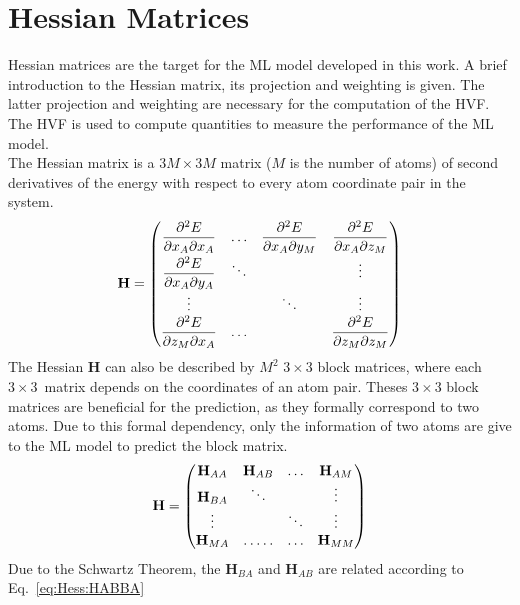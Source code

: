 \newpage
    \section{Hessian Matrices}
	Hessian matrices are the target for the ML model developed in this work.
	A brief introduction to the Hessian matrix, its projection and weighting is given.
	The latter projection and weighting are necessary for the computation of the HVF.
	The HVF is used to compute quantities to measure the performance of the ML model.\\
	The Hessian matrix is a $3M \times 3M$ matrix ($M$ is the number of atoms) of second derivatives
	of the energy with respect to every atom coordinate pair in the system.\supercite{Jensen2013}
	\begin{align}
		\textbf{H} =
		\left(\begin{matrix}
			\dfrac{\partial^2 E}{\partial x_A \partial x_A} & \hdotsfor{1} & \dfrac{\partial^2 E}{\partial x_A \partial y_M} &
			\dfrac{\partial^2 E}{\partial x_A \partial z_M} \vspace*{2pt} \\
			\dfrac{\partial^2 E}{\partial x_A \partial y_A} & \ddots & & \vdots \\
			\vdots & & \ddots & \vdots \\
			\dfrac{\partial^2 E}{\partial z_M \partial x_A}  & \hdotsfor{0} & & \dfrac{\partial^2 E}{\partial z_M \partial z_M} 
		\end{matrix}\right)
	\end{align}
	The Hessian \textbf{H} can also be described by $M^2$ $3 \times 3$ block matrices,
	where each $3 \times 3$~matrix depends on the coordinates of an atom pair.
	Theses $3 \times 3$ block matrices are beneficial for the prediction, as they formally correspond to two atoms.
	Due to this formal dependency, only the information of two atoms are give to the ML model to predict the block matrix.
	\begin{align}
		\textbf{H} =
		\left(\begin{matrix}
			\textbf{H}_{AA} & \textbf{H}_{AB} & \hdotsfor{0} &  \textbf{H}_{AM}\\
			\textbf{H}_{BA}& \ddots & & \vdots\\
			\vdots & & \ddots & \vdots \\
			\textbf{H}_{MA} &\hdotsfor{0} & \hdotsfor{0}& \textbf{H}_{MM} \\
		\end{matrix}\right)
	\end{align}
	Due to the Schwartz Theorem, the $\textbf{H}_{BA}$ and $\textbf{H}_{AB}$ are related according to Eq.~\eqref{eq:Hess:HABBA}
